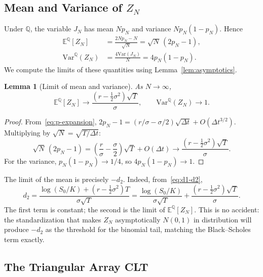\documentclass[11pt,a4paper]{article}
\newcommand{\Var}{\mathrm{Var}}
\theoremstyle{plain}
\newtheorem{lemma}[theorem]{Lemma}
\theoremstyle{definition}
\newcommand{\E}{\mathbb{E}}
\newcommand{\Q}{\mathbb{Q}}
\begin{document}
\subsection{Mean and Variance of $Z_N$}
\label{subsec:mean-var}

Under $\Q$, the variable $J_N$ has mean $N p_N$ and variance
$N p_N (1 - p_N)$. Hence
\begin{align}
    \E^{\Q}[Z_N] &= \frac{2 N p_N - N}{\sqrt{N}} = \sqrt{N}\,(2 p_N - 1), \label{eq:EZ}\\
    \Var^{\Q}(Z_N) &= \frac{4 \Var(J_N)}{N} = 4 p_N (1 - p_N). \label{eq:VarZ}
\end{align}
We compute the limits of these quantities using
Lemma~\ref{lem:asymptotics}.

\begin{lemma}[Limit of mean and variance]
\label{lem:limit-mean-var}
As $N \to \infty$,
\begin{equation}
    \label{eq:limit-mean-var}
    \E^{\Q}[Z_N] \to \frac{(r - \tfrac{1}{2}\sigma^2)\sqrt{T}}{\sigma},
    \qquad
    \Var^{\Q}(Z_N) \to 1.
\end{equation}
\end{lemma}

\begin{proof}
From~\eqref{eq:p-expansion}, $2 p_N - 1 = (r/\sigma - \sigma/2)\sqrt{\Delta t}
+ O(\Delta t^{3/2})$. Multiplying by $\sqrt{N} = \sqrt{T/\Delta t}$:
\[
\sqrt{N}\,(2 p_N - 1)
= \left(\frac{r}{\sigma} - \frac{\sigma}{2}\right)\sqrt{T}
   + O(\Delta t)
\to \frac{(r - \tfrac{1}{2}\sigma^2)\sqrt{T}}{\sigma}.
\]
For the variance, $p_N (1 - p_N) \to 1/4$, so
$4 p_N (1-p_N) \to 1$.
\end{proof}

The limit of the mean is precisely $-d_2$. Indeed, from~\eqref{eq:d1-d2},
\[
d_2 = \frac{\log(S_0 / K) + (r - \tfrac{1}{2}\sigma^2)T}{\sigma\sqrt{T}}
    = \frac{\log(S_0/K)}{\sigma\sqrt{T}}
      + \frac{(r - \tfrac{1}{2}\sigma^2)\sqrt{T}}{\sigma}.
\]
The first term is constant; the second is the limit of $\E^{\Q}[Z_N]$.
This is no accident: the standardization that makes $Z_N$ asymptotically
$N(0,1)$ in distribution will produce $-d_2$ as the threshold for the
binomial tail, matching the Black--Scholes term exactly.

\subsection{The Triangular Array CLT}
\label{subsec:triangular-clt}
\end{document}
